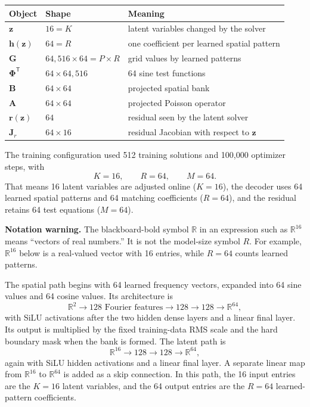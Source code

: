 \documentclass[11pt]{article}
\newcommand{\mat}[1]{\mathbf{#1}}
\newcommand{\vect}[1]{\mathbf{#1}}
\newcommand{\R}{\mathbb{R}}
\begin{document}
\begin{center}
\begin{tabular}{@{}lll@{}}
\toprule
Object & Shape & Meaning \\
\midrule
$\vect{z}$ & $16=K$ & latent variables changed by the solver \\
$\vect{h}(\vect{z})$ & $64=R$ & one coefficient per learned spatial pattern \\
$\mat{G}$ & $64{,}516\times64=P\times R$ & grid values by learned patterns \\
$\mat{\Phi}^{\mathsf T}$ & $64\times64{,}516$ & 64 sine test functions \\
$\mat{B}$ & $64\times64$ & projected spatial bank \\
$\mat{A}$ & $64\times64$ & projected Poisson operator \\
$\vect{r}(\vect{z})$ & $64$ & residual seen by the latent solver \\
$\mat{J}_r$ & $64\times16$ & residual Jacobian with respect to $\vect{z}$ \\
\bottomrule
\end{tabular}
\end{center}

The training configuration used 512 training solutions and 100,000 optimizer
steps, with
\begin{equation}
  K=16,\qquad R=64,\qquad M=64.
\end{equation}
That means 16 latent variables are adjusted online ($K=16$), the decoder uses
64 learned spatial patterns and 64 matching coefficients ($R=64$), and the
residual retains 64 test equations ($M=64$).

\textbf{Notation warning.}  The blackboard-bold symbol $\mathbb{R}$ in an
expression such as $\mathbb{R}^{16}$ means ``vectors of real numbers.''  It is
not the model-size symbol $R$.  For example, $\mathbb{R}^{16}$ below is a
real-valued vector with 16 entries, while $R=64$ counts learned patterns.

The spatial path begins with 64 learned frequency vectors, expanded into 64
sine values and 64 cosine values.  Its architecture is
\begin{equation}
  \R^2
  \longrightarrow 128\text{ Fourier features}
  \longrightarrow 128
  \longrightarrow 128
  \longrightarrow \R^{64},
\end{equation}
with SiLU activations after the two hidden dense layers and a linear final
layer.  Its output is multiplied by the fixed training-data RMS scale and the
hard boundary mask when the bank is formed.  The latent path is
\begin{equation}
  \R^{16}\longrightarrow128\longrightarrow128\longrightarrow\R^{64},
\end{equation}
again with SiLU hidden activations and a linear final layer.  A separate linear
map from $\R^{16}$ to $\R^{64}$ is added as a skip connection.  In this path,
the 16 input entries are the $K=16$ latent variables, and the 64 output entries
are the $R=64$ learned-pattern coefficients.
\end{document}
